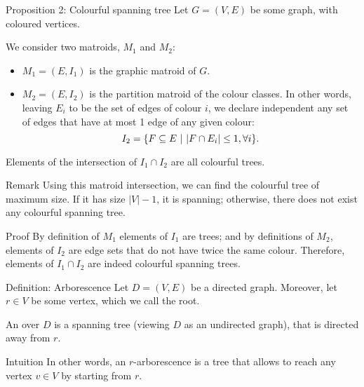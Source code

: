 \documentclass[a4paper]{article}
\begin{document}
\begin{parag}{Proposition 2: Colourful spanning tree}
    Let $G = \left(V, E\right)$ be some graph, with coloured vertices.

    We consider two matroids, $M_1$ and $M_2$:
    \begin{itemize}[left=0pt]
        \item $M_1 = \left(E, I_1\right)$ is the graphic matroid of $G$. 
        \item $M_2 = \left(E, I_2\right)$ is the partition matroid of the colour classes. In other words, leaving $E_i$ to be the set of edges of colour $i$, we declare independent any set of edges that have at most 1 edge of any given colour:
        \[I_2 = \left\{F \subseteq E \suchthat \left|F \cap E_i\right| \leq 1, \forall i\right\}.\]
    \end{itemize}
    
    Elements of the intersection of $I_1 \cap I_2$ are all colourful trees.

    \begin{subparag}{Remark}
        Using this matroid intersection, we can find the colourful tree of maximum size. If it has size $\left|V\right| - 1$, it is spanning; otherwise, there does not exist any colourful spanning tree.
    \end{subparag}

    \begin{subparag}{Proof}
        By definition of $M_1$ elements of $I_1$ are trees; and by definitions of $M_2$, elements of $I_2$ are edge sets that do not have twice the same colour. Therefore, elements of $I_1 \cap I_2$ are indeed colourful spanning trees.
    \end{subparag}
\end{parag}

\begin{parag}{Definition: Arborescence}
    Let $D = \left(V, E\right)$ be a directed graph. Moreover, let $r \in V$ be some vertex, which we call the root.

    An  over $D$ is a spanning tree (viewing $D$ as an undirected graph), that is directed away from $r$.

    \begin{subparag}{Intuition}
        In other words, an $r$-arborescence is a tree that allows to reach any vertex $v \in V$ by starting from $r$.
    \end{subparag}
\end{parag}
\end{document}
